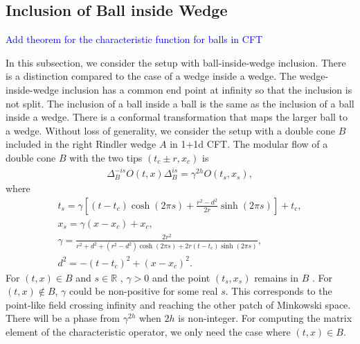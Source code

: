 \documentclass[a4paper,11pt]{article}
\theoremstyle{definition}
\newcommand{\NL}[1]{\textcolor{blue}{#1}}
\begin{document}
\subsection{Inclusion of Ball inside Wedge}

\NL{Add theorem for the characteristic function for balls in CFT}

In this subsection, we consider the setup with ball-inside-wedge inclusion. There is a distinction compared to the case of a wedge inside a wedge. The wedge-inside-wedge inclusion has a common end point at infinity so that the inclusion is not split. The inclusion of a ball inside a ball is the same as the inclusion of a ball inside a wedge. There is a conformal transformation that maps the larger ball to a wedge. Without loss of generality, we consider the setup with a double cone $B$ included in the right Rindler wedge $A$ in 1+1d CFT. The modular flow of a double cone $B$ with the two tips $(t_c\pm r,x_c)$ is
\begin{align}
    \Delta_B^{-is} O(t,x) \Delta_B^{is} = \gamma^{2h} O(t_s,x_s),
\end{align}
where
\begin{gather}
    t_s = \gamma \left[(t-t_c)\cosh(2\pi s) + \frac{r^2-d^2}{2r}\sinh(2\pi s)\right] + t_c,\\
    x_s = \gamma (x-x_c) + x_c,\\
    \gamma = \frac{2r^2}{r^2+d^2 + (r^2-d^2)\cosh(2\pi s) +2r(t-t_c)\sinh(2\pi s)}, \\
    d^2 = -(t-t_c)^2 + (x-x_c)^2.
\end{gather}
For $(t,x) \in B$ and $s\in \mathbb{R}$ , $\gamma>0$ and the point $(t_s,x_s)$ remains in $B$ . For $(t,x) \notin B$, $\gamma$ could be non-positive for some real $s$. This corresponds to the point-like field crossing infinity and reaching the other patch of Minkowski space. There will be a phase from $\gamma^{2h}$ when $2h$ is non-integer. For computing the matrix element of the characteristic operator, we only need the case where $(t,x) \in B$.
\end{document}
